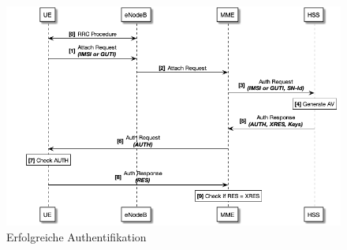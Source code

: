 \begin{figure}[H]
  \centering
  \includegraphics[width=\textwidth]{uml/4g-protocol_v1.png}
  \caption{Erfolgreiche Authentifikation}
  \label{fig:4g_protocol_v1}
\end{figure} %

